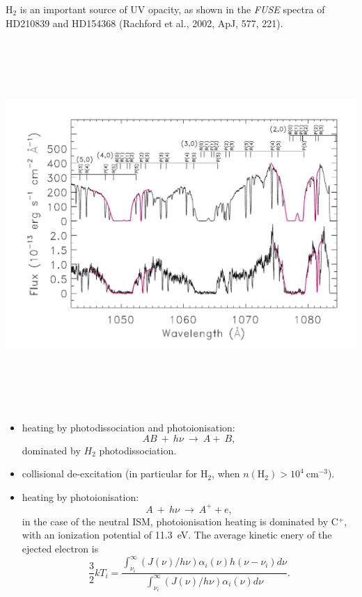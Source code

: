 
H$_2$ is an important source of UV opacity, as shown in the {\em FUSE}
spectra of HD210839 and HD154368 (Rachford et al., 2002, ApJ, 577,
221).

\includegraphics[width=25cm,height=14cm]{./B/fuse_H2}
\vfill

\foilhead{}

\begin{itemize}
\item heating by photodissociation and photoionisation: 
\[AB ~  + ~h\nu ~\rightarrow~ A +~ B, \]
dominated by  $H_2$ photodissociation. 

\item collisional de-excitation (in particular for H$_2$, when  
$n(\mathrm{H}_2) > 10^4~$cm$^{-3}$).


\item heating by photoionisation: 
\[A ~  + ~h\nu ~\rightarrow~ A^+  + e, \]
in the case of the neutral ISM, photoionisation heating is dominated
by C$^+$, with an ionization potential of 11.3~eV. The average kinetic
enery of the ejected electron is 
\[ \frac{3}{2}kT_i = \frac{\int_{\nu_i}^{\infty} (J(\nu)/h\nu) \alpha_i(\nu) h(\nu
-\nu_i) d\nu}{\int_{\nu_i}^{\infty} (J(\nu)/h\nu) \alpha_i(\nu)d\nu
 }. \]

\end{itemize}

